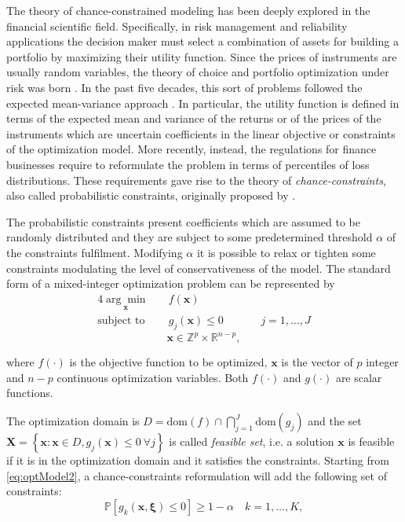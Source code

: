 The theory of chance-constrained modeling has been deeply explored in the financial scientific field. Specifically, in risk management and reliability applications the decision maker must select a combination of assets for building a portfolio by maximizing their utility function. Since the prices of instruments are usually random variables, the theory of choice and portfolio optimization under risk was born \parencite[see][]{rockafellar2000optimization,rockafellar2001uryasev}. In the past five decades, this sort of problems followed the expected mean-variance approach \parencite{chen1973quadratic,freund1956introduction,scott1972practical}. In particular, the utility function is defined in terms of the expected mean and variance of the returns or of the prices of the instruments which are uncertain coefficients in the linear objective or constraints of the optimization model. More recently, instead, the regulations for finance businesses require to reformulate the problem in terms of percentiles of loss distributions. These requirements gave rise to the theory of \emph{chance-constraints}, also called probabilistic constraints, originally proposed by \textcite{Charnes1959}. 

The probabilistic constraints present coefficients which are assumed to be randomly distributed and they are subject to some predetermined threshold $\alpha$ of the constraints fulfilment. Modifying $\alpha$ it is possible to relax or tighten some constraints modulating the level of conservativeness of the model.
The standard form of a mixed-integer optimization problem can be represented by  
\begin{alignat}{4}\label{eq:optModel2}	\underset{\mathbf{x}}{\arg \min} \quad & f(\mathbf{x}) &&\quad  & \\
\nonumber
\text{subject to} \quad & g_j(\mathbf{x}) \leq 0 &&\quad & j=1,\ldots,J
\end{alignat}
\begin{equation}\nonumber
\mathbf{x} \in \mathbb{Z}^p \times \mathbb{R}^{n-p},   
\end{equation}

\noindent where $f(\cdot)$ is the objective function to be optimized, $\mathbf{x}$ is the vector of $p$ integer and $n-p$ continuous optimization variables. Both $f(\cdot)$ and $g(\cdot)$ are scalar functions.

The optimization domain is $D=\text{dom}(f) \cap \bigcap_{j=1}^J \text{dom}(g_j)$ and the set \\ $\mathbf{X}=\left\{\mathbf{x} : \mathbf{x} \in D, g_j(\mathbf{x}) \leq 0 \ \forall j \right\}$ is called \emph{feasible set}, i.e. a solution $\mathbf{x}$ is feasible if it is in the optimization domain and it satisfies the constraints. Starting from \eqref{eq:optModel2}, a chance-constraints reformulation will add the following set of constraints:
\begin{equation}\label{eq:CCcon}
\mathbb{P}\left[g_k(\mathbf{x},\boldsymbol{\xi})\leq 0\right] \geq 1-\alpha \quad k=1,\ldots,K,
\end{equation}

